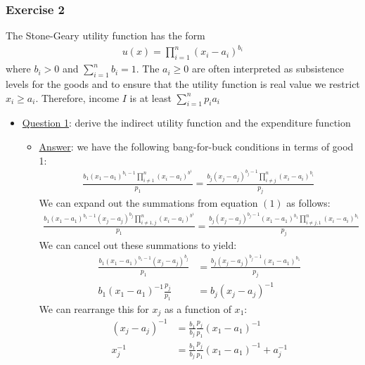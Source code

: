 \documentclass{article}
\begin{document}
\subsubsection{Exercise 2}
The Stone-Geary utility function has the form
\begin{gather*}
  u(x) = \prod_{i=1}^{n}(x_{i} - a_{i})^{b_{i}}
\end{gather*}
where $b_{i} > 0$ and $\sum_{i=1}^{n}b_{i} = 1$. The $a_{i} \geq 0$ are often interpreted as subsistence levels for the goods and to ensure that the utility function is real value we restrict $x_{i} \geq a_{i}$. Therefore, income $I$ is at least $\sum_{i=1}^{n} p_{i}a_{i}$ \par \vspace{0.3em}
\begin{itemize}
  \item  \underline{Question 1}: derive the indirect utility function and the expenditure function
  \begin{itemize}
    \item  \underline{Answer}: we have the following bang-for-buck conditions in terms of good 1:
    \begin{gather*}
      \frac{b_{1}(x_{1}-a_{1})^{b_{1}-1}\prod_{i \neq 1}^{n}(x_{i} - a_{i})^{b^{1}}}{p_{1}} = \frac{b_{j}(x_{j} - a_{j})^{b_{j}-1} \prod_{i \neq j}^{n}(x_{i} - a_{i})^{b_{i}}}{p_{j}} \ \tag{1}
    \end{gather*}
    We can expand out the summations from equation $(1)$ as follows:
    \begin{gather*}
      \frac{b_{1}(x_{1}-a_{1})^{b_{1}-1} (x_{j} - a_{j})^{b_{j}} \prod_{i \neq 1,j}^{n}(x_{i} - a_{i})^{b^{1}}}{p_{1}} = \frac{b_{j}(x_{j} - a_{j})^{b_{j}-1} (x_{1} - a_{1})^{b_{1}} \prod_{i \neq j,1}^{n}(x_{i} - a_{i})^{b_{i}}}{p_{j}}
    \end{gather*}
    We can cancel out these summations to yield:
    \begin{align*}
      \frac{b_{1}(x_{1}-a_{1})^{b_{1}-1} (x_{j} - a_{j})^{b_{j}}}{p_{1}} &= \frac{b_{j}(x_{j} - a_{j})^{b_{j}-1} (x_{1} - a_{1})^{b_{1}}}{p_{j}} \\
      b_{1}(x_{1} - a_{1})^{-1} \frac{p_{j}}{p_{1}} &= b_{j}(x_{j} - a_{j})^{-1}
    \end{align*}
    We can rearrange this for $x_{j}$ as a function of $x_{1}$:
    \begin{align*}
      (x_{j} - a_{j})^{-1} &= \frac{b_{1}}{b_{j}} \frac{p_{j}}{p_{1}} (x_{1} - a_{1})^{-1} \\
      x_{j}^{-1} &= \frac{b_{1}}{b_{j}} \frac{p_{j}}{p_{1}} (x_{1} - a_{1})^{-1} + a_{j}^{-1} \\

\end{align*}
\end{itemize}
\end{itemize}
\end{document}
